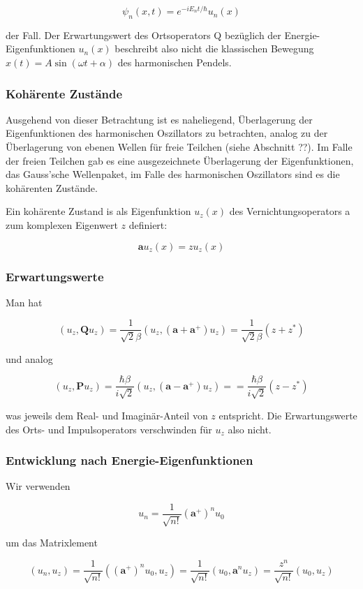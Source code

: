 \documentclass[10pt, letterpaper]{article}
\begin{document}
$$
\psi_{n}(x, t)=e^{-i E_{n} t / \hbar} u_{n}(x)
$$

der Fall. Der Erwartungswert des Ortsoperators Q bezüglich der Energie-Eigenfunktionen $u_{n}(x)$ beschreibt also nicht die klassischen Bewegung $x(t)=A \sin (\omega t+\alpha)$ des harmonischen Pendels.

\subsubsection*{Kohärente Zustände}
Ausgehend von dieser Betrachtung ist es naheliegend, Überlagerung der Eigenfunktionen des harmonischen Oszillators zu betrachten, analog zu der Überlagerung von ebenen Wellen für freie Teilchen (siehe Abschnitt ??). Im Falle der freien Teilchen gab es eine ausgezeichnete Überlagerung der Eigenfunktionen, das Gauss'sche Wellenpaket, im Falle des harmonischen Oszillators sind es die kohärenten Zustände.

Ein kohärente Zustand is als Eigenfunktion $u_{z}(x)$ des Vernichtungsoperators a zum komplexen Eigenwert $z$ definiert:

$$
\mathbf{a} u_{z}(x)=z u_{z}(x)
$$

\subsubsection*{Erwartungswerte}
Man hat

$$
\left(u_{z}, \mathbf{Q} u_{z}\right)=\frac{1}{\sqrt{2} \beta}\left(u_{z},\left(\mathbf{a}+\mathbf{a}^{+}\right) u_{z}\right)=\frac{1}{\sqrt{2} \beta}\left(z+z^{*}\right)
$$

und analog

$$
\left(u_{z}, \mathbf{P} u_{z}\right)=\frac{\hbar \beta}{i \sqrt{2}}\left(u_{z},\left(\mathbf{a}-\mathbf{a}^{+}\right) u_{z}\right)==\frac{\hbar \beta}{i \sqrt{2}}\left(z-z^{*}\right)
$$

was jeweils dem Real- und Imaginär-Anteil von $z$ entspricht. Die Erwartungswerte des Orts- und Impulsoperators verschwinden für $u_{z}$ also nicht.

\subsubsection*{Entwicklung nach Energie-Eigenfunktionen}
Wir verwenden

$$
u_{n}=\frac{1}{\sqrt{n!}}\left(\mathbf{a}^{+}\right)^{n} u_{0}
$$

um das Matrixlement

$$
\left(u_{n}, u_{z}\right)=\frac{1}{\sqrt{n!}}\left(\left(\mathbf{a}^{+}\right)^{n} u_{0}, u_{z}\right)=\frac{1}{\sqrt{n!}}\left(u_{0}, \mathbf{a}^{n} u_{z}\right)=\frac{z^{n}}{\sqrt{n!}}\left(u_{0}, u_{z}\right)
$$
\end{document}

